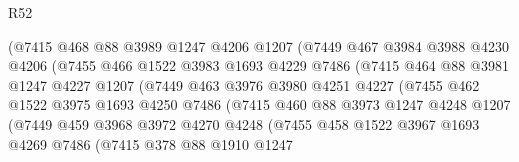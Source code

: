 \begin{lexlean}{R52}
\begin{coremodule}
                        (@7415
                          @468
                          @88
                          @3989
                          @1247
                          @4206
                          @1207
                          (@7449
                            @467
                            @3984
                            @3988
                            @4230
                            @4206
                            (@7455
                              @466
                              @1522
                              @3983
                              @1693
                              @4229
                              @7486
                              (@7415
                                @464
                                @88
                                @3981
                                @1247
                                @4227
                                @1207
                                (@7449
                                  @463
                                  @3976
                                  @3980
                                  @4251
                                  @4227
                                  (@7455
                                    @462
                                    @1522
                                    @3975
                                    @1693
                                    @4250
                                    @7486
                                    (@7415
                                      @460
                                      @88
                                      @3973
                                      @1247
                                      @4248
                                      @1207
                                      (@7449
                                        @459
                                        @3968
                                        @3972
                                        @4270
                                        @4248
                                        (@7455
                                          @458
                                          @1522
                                          @3967
                                          @1693
                                          @4269
                                          @7486
                                          (@7415
                                            @378
                                            @88
                                            @1910
                                            @1247

\end{coremodule}
\end{lexlean}
